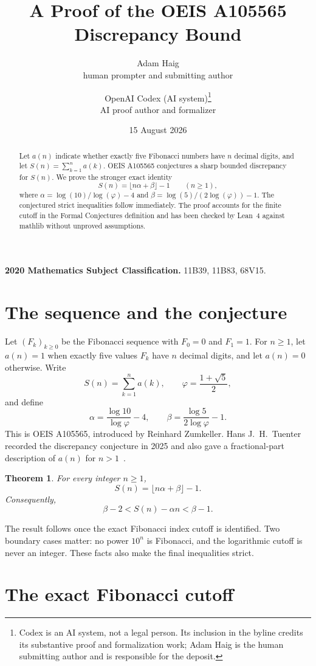 \documentclass[11pt]{article}
\title{\textbf{A Proof of the OEIS A105565 Discrepancy Bound}}
\author{
  Adam Haig\\[-2pt]
  \small human prompter and submitting author
  \and
  OpenAI Codex (AI system)\thanks{Codex is an AI system, not a legal person. Its
  inclusion in the byline credits its substantive proof and formalization work;
  Adam Haig is the human submitting author and is responsible for the deposit.}\\[-2pt]
  \small AI proof author and formalizer
}
\date{15 August 2026}
\newtheorem{theorem}{Theorem}
\newcommand{\fib}{F}
\begin{document}
\maketitle

\begin{abstract}
Let $a(n)$ indicate whether exactly five Fibonacci numbers have $n$ decimal
digits, and let $S(n)=\sum_{k=1}^{n}a(k)$.  OEIS A105565 conjectures a sharp
bounded discrepancy for $S(n)$.  We prove the stronger exact identity
\[
  S(n)=\lfloor n\alpha+\beta\rfloor-1 \qquad (n\geq 1),
\]
where $\alpha=\log(10)/\log(\varphi)-4$ and
$\beta=\log(5)/(2\log(\varphi))-1$.  The conjectured strict inequalities follow
immediately.  The proof accounts for the finite cutoff in the Formal
Conjectures definition and has been checked by Lean~4 against mathlib without
unproved assumptions.
\end{abstract}

\noindent\textbf{2020 Mathematics Subject Classification.}
11B39, 11B83, 68V15.

\section{The sequence and the conjecture}

Let $(\fib_k)_{k\geq 0}$ be the Fibonacci sequence with $\fib_0=0$ and
$\fib_1=1$.  For $n\geq 1$, let $a(n)=1$ when exactly five values $\fib_k$
have $n$ decimal digits, and let $a(n)=0$ otherwise.  Write
\[
 S(n)=\sum_{k=1}^{n}a(k), \qquad
 \varphi=\frac{1+\sqrt5}{2},
\]
and define
\[
 \alpha=\frac{\log 10}{\log\varphi}-4,
 \qquad
 \beta=\frac{\log 5}{2\log\varphi}-1.
\]
This is OEIS A105565, introduced by Reinhard Zumkeller.  Hans J.~H.~Tuenter
recorded the discrepancy conjecture in 2025 and also gave a fractional-part
description of $a(n)$ for $n>1$~\cite{oeis-a105565}.

\begin{theorem}\label{thm:main}
For every integer $n\geq 1$,
\[
 S(n)=\lfloor n\alpha+\beta\rfloor-1.
\]
Consequently,
\[
 \beta-2<S(n)-\alpha n<\beta-1.
\]
\end{theorem}

The result follows once the exact Fibonacci index cutoff is identified.  Two
boundary cases matter: no power $10^n$ is Fibonacci, and the logarithmic
cutoff is never an integer.  These facts also make the final inequalities
strict.

\section{The exact Fibonacci cutoff}
\end{document}
